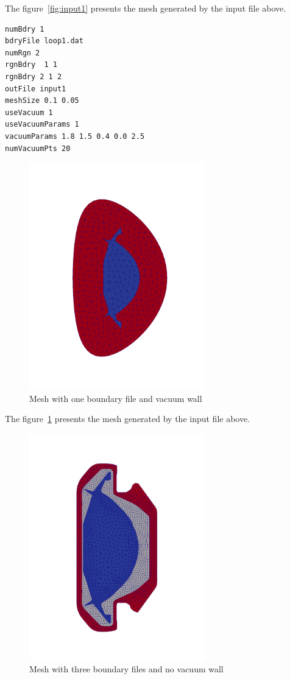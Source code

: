 The figure~\ref{fig:input1} presents the mesh generated by the input file above.

\begin{verbatim}
numBdry 1
bdryFile loop1.dat
numRgn 2
rgnBdry  1 1
rgnBdry 2 1 2
outFile input1
meshSize 0.1 0.05
useVacuum 1
useVacuumParams 1
vacuumParams 1.8 1.5 0.4 0.0 2.5
numVacuumPts 20
\end{verbatim}

\begin{figure}
\centering
\includegraphics[width=3in]{./figures/meshgen-input1.pdf}
\caption[Mesh with one boundary file and vacuum wall]
{Mesh with one boundary file and vacuum wall}
\label{fig:input1-vacuum}
\end{figure}

The figure~\ref{fig:input1-vacuum} presents the mesh generated by the input file above.

\begin{figure}
\centering
\includegraphics[width=3in]{./figures/meshgen-input3-novacuum.pdf}
\caption[Mesh with three boundary files and no vacuum wall]
{Mesh with three boundary files and no vacuum wall}
\label{fig:input3-novacuum}
\end{figure}

